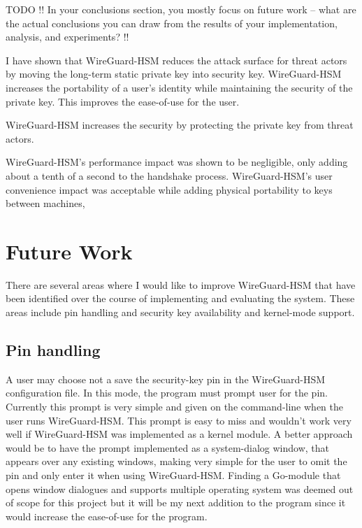 \documentclass [11pt, proquest] {uwthesis}[2020/02/24]
\begin{document}
TODO !! In your conclusions section, you mostly focus on future work -- what are the actual conclusions you can draw from the results of your implementation, analysis, and experiments? !!

I have shown that WireGuard-HSM reduces the attack surface for threat actors by moving the long-term static private key into security key. WireGuard-HSM increases the portability of a user's identity while maintaining the security of the private key. This improves the ease-of-use for the user.

WireGuard-HSM increases the security by protecting the private key from threat actors.

WireGuard-HSM's performance impact was shown to be negligible, only adding about a tenth of a second to the handshake process.
WireGuard-HSM's user convenience impact was acceptable while adding physical portability to keys between machines,

\section {Future Work}
There are several areas where I would like to improve WireGuard-HSM that have been identified over the course of implementing and evaluating the system. These areas include pin handling and security key availability and kernel-mode support.

\subsection{Pin handling}
 A user may choose not a save the security-key pin in the WireGuard-HSM configuration file. In this mode, the program must prompt user for the pin. Currently this prompt is very simple and given on the command-line when the user runs WireGuard-HSM. This prompt is easy to miss and wouldn't work very well if WireGuard-HSM was implemented as a kernel module. A better approach would be to have the prompt implemented as a system-dialog window, that appears over any existing windows, making very simple for the user to omit the pin and only enter it when using WireGuard-HSM. Finding a Go-module that opens window dialogues and supports multiple operating system was deemed out of scope for this project but it will be my next addition to the program since it would increase the ease-of-use for the program. 
 
\end{document}

